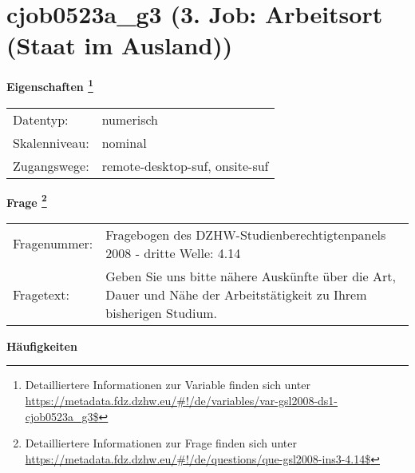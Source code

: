
    \setcounter{footnote}{0}

    \vspace*{-1.8cm}
	\section{cjob0523a\_g3 (3. Job: Arbeitsort (Staat im Ausland))}
	\label{section:cjob0523a_g3}



    \vspace*{0.5cm}
    \noindent\textbf{Eigenschaften
	\footnote{Detailliertere Informationen zur Variable finden sich unter
		\url{https://metadata.fdz.dzhw.eu/\#!/de/variables/var-gsl2008-ds1-cjob0523a_g3$}}}\\
	\begin{tabularx}{\hsize}{@{}lX}
	Datentyp: & numerisch \\
	Skalenniveau: & nominal \\
	Zugangswege: &
	  remote-desktop-suf, 
	  onsite-suf
 \\
    \end{tabularx}



				\vspace*{0.5cm}
                \noindent\textbf{Frage
	                \footnote{Detailliertere Informationen zur Frage finden sich unter
		              \url{https://metadata.fdz.dzhw.eu/\#!/de/questions/que-gsl2008-ins3-4.14$}}}\\
				\begin{tabularx}{\hsize}{@{}lX}
					Fragenummer: &
					  Fragebogen des DZHW-Studienberechtigtenpanels 2008 - dritte Welle:
					  4.14
 \\
					Fragetext: & Geben Sie uns bitte nähere Auskünfte über die Art, Dauer und Nähe der Arbeitstätigkeit zu Ihrem bisherigen Studium. \\
				\end{tabularx}





        		\vspace*{0.5cm}
                \noindent\textbf{Häufigkeiten}

